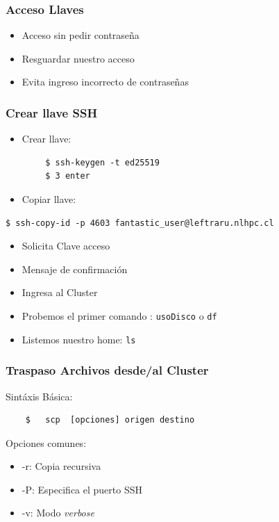 \documentclass[aspectratio=169,professionalfonts]{beamer}
\newenvironment{minted}[2][]{\VerbatimEnvironment\begin{Verbatim}[#1]}{\end{Verbatim}}
\begin{document}
\begin{frame}[fragile]
\frametitle{\textbf{Acceso Llaves}}
\begin{itemize}
    \item Acceso sin pedir contraseña
            \vspace{0.5em} 

    \item Resguardar nuestro acceso 
            \vspace{0.5em} 

    \item Evita ingreso incorrecto de contraseñas
    
\end{itemize}
    
\end{frame}

\begin{frame} [fragile]
\frametitle{\textbf{Crear llave SSH}}
\begin{itemize}
    \item Crear llave:
    \end{itemize}
    \begin{verbatim}
        $ ssh-keygen -t ed25519
        $ 3 enter
    \end{verbatim}
    
    \begin{itemize}
        \item Copiar llave:
    \end{itemize}

\begin{verbatim}
$ ssh-copy-id -p 4603 fantastic_user@leftraru.nlhpc.cl
    \end{verbatim}
\begin{itemize}
    \item Solicita Clave acceso
    \item Mensaje de confirmación
\item Ingresa al Cluster 
\item Probemos el primer comando : \texttt{usoDisco} o \texttt{df}
\item Listemos nuestro home: \texttt{ls}

    \end{itemize}
\end{frame}

\begin{frame}[fragile]
\frametitle{\textbf{Traspaso Archivos desde/al Cluster}}
Sintáxis Básica: \\
\begin{verbatim}
    $   scp  [opciones] origen destino
\end{verbatim}
\vspace{0.5em}
Opciones comunes:
    \begin{itemize}
        \item -r: Copia recursiva
        \vspace{0.5em}
        \item -P: Especifica el puerto SSH
        \vspace{0.5em}
        \item -v: Modo \textit{verbose}
    \end{itemize}
\end{frame}
\end{document}

